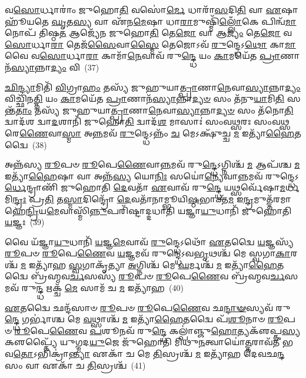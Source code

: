 {\anuvakamend[{𑌅\-\ul{𑌗𑍍𑌨𑍇} 𑌪𑍍𑌰𑍇𑌹𑍍𑌯𑌵᳴ 𑌸𑍍𑌮 𑌦𑍁\-\ul{𑌹𑍇} 𑌤𑌾𑌂 \ul{𑌪𑍍𑌰}\-𑌜𑌾𑌪᳴𑌤𑍇𑌃 \ul{𑌸𑌾}\-𑌕𑍍𑌷𑌾𑌨𑍍𑌮᳴𑌨𑍁𑌷𑍍𑌯\-\ul{𑌵𑌿}\-𑌶𑌮𑍇𑌕᳴𑌵𑌿𑍞𑌶𑌤𑌿𑌶𑍍𑌚}]}%

𑌵\-\ul{𑌸𑍋}\-𑌰𑍍𑌧𑌾𑌰𑌾𑌂॑ 𑌜𑍁𑌹𑍋\-\ul{𑌤𑌿} 𑌵𑌸𑍋॑\-\ul{𑌰𑍍𑌮𑍇} 𑌧𑌾𑌰𑌾᳴\-\ul{𑌸}\-𑌦𑌿\-\ul{𑌤𑌿} 𑌵𑌾 \ul{𑌏}\-𑌷𑌾 𑌹𑍂᳴𑌯𑌤𑍇 \ul{𑌘𑍃}\-𑌤\-\ul{𑌸𑍍𑌯} 𑌵𑌾 𑌏᳴𑌨\-\ul{𑌮𑍇}\-𑌷𑌾 𑌧𑌾\-\ul{𑌰𑌾}\-𑌮𑍁𑌷𑍍𑌮𑌿᳴\-\ul{𑌲𑍍𑌲𑍋𑌁}\-𑌕𑍇 𑌪𑌿𑌨𑍍𑌵᳴\-\ul{𑌮𑌾}\-𑌨𑍋𑌪᳴ 𑌤𑌿𑌷𑍍𑌠\-\ul{𑌤} 𑌆𑌜𑍍𑌯𑍇᳴𑌨 𑌜𑍁𑌹𑍋\-\ul{𑌤𑌿} 𑌤𑍇\-\ul{𑌜𑍋} 𑌵𑌾 𑌆\-\ul{𑌜𑍍𑌯𑌂} 𑌤𑍇\-\ul{𑌜𑍋} 𑌵\-\ul{𑌸𑍋}\-𑌰𑍍𑌧𑌾\-\ul{𑌰𑌾} 𑌤𑍇𑌜᳴\-\ul{𑌸𑍈}\-𑌵𑌾\-\ul{𑌸𑍍𑌮𑍈} 𑌤𑍇𑌜𑍋\-𑌽𑌵᳴ \ul{𑌰𑍁}\-𑌨𑍍𑌦𑍍𑌧𑍇\-𑌽\-\ul{𑌥𑍋} 𑌕𑌾\-\ul{𑌮𑌾} 𑌵𑍈 𑌵\-\ul{𑌸𑍋}\-𑌰𑍍𑌧𑌾\-\ul{𑌰𑌾} 𑌕𑌾𑌮𑌾᳴\-\ul{𑌨𑍇}\-𑌵𑌾𑌵᳴ 𑌰𑍁\-\ul{𑌨𑍍𑌦𑍍𑌧𑍇} 𑌯𑌂 \ul{𑌕𑌾}\-𑌮𑌯𑍇᳴𑌤 \ul{𑌪𑍍𑌰𑌾}\-𑌣𑌾𑌨᳴\-\ul{𑌸𑍍𑌯𑌾}\-𑌨𑍍𑌨𑌾\-\ul{𑌦𑍍𑌯𑌂} 𑌵𑌿~(37)

\-\ul{𑌛𑌿}\-\-\ul{𑌨𑍍𑌦𑍍𑌯𑌾}\-𑌮𑌿𑌤𑌿᳴ \ul{𑌵𑌿}\-𑌗𑍍𑌰𑌾\-\ul{𑌹𑌂} 𑌤𑌸𑍍𑌯᳴ 𑌜𑍁𑌹𑍁𑌯𑌾\-\ul{𑌤𑍍𑌪𑍍𑌰𑌾}\-𑌣𑌾\-\ul{𑌨𑍇}\-𑌵𑌾\-\ul{𑌸𑍍𑌯𑌾}\-𑌨𑍍𑌨𑌾\-\ul{𑌦𑍍𑌯𑌂} 𑌵𑌿𑌚𑍍𑌛𑌿᳴𑌨\-\ul{𑌤𑍍𑌤𑌿} 𑌯𑌂 \ul{𑌕𑌾}\-𑌮𑌯𑍇᳴𑌤 \ul{𑌪𑍍𑌰𑌾}\-𑌣𑌾𑌨᳴\-\ul{𑌸𑍍𑌯𑌾}\-𑌨𑍍𑌨𑌾\-\ul{𑌦𑍍𑌯}\-\-\ul{𑍞} 𑌸𑌂 𑌤᳴𑌨𑍁\-\ul{𑌯𑌾}\-𑌮𑌿\-\ul{𑌤𑌿} 𑌸𑌨𑍍𑌤᳴\-\ul{𑌤𑌾𑌂} 𑌤𑌸𑍍𑌯᳴ 𑌜𑍁𑌹𑍁𑌯𑌾\-\ul{𑌤𑍍𑌪𑍍𑌰𑌾}\-𑌣𑌾\-\ul{𑌨𑍇}\-𑌵𑌾\-\ul{𑌸𑍍𑌯𑌾}\-𑌨𑍍𑌨𑌾\-\ul{𑌦𑍍𑌯}\-\-\ul{𑍞} 𑌸𑌂 𑌤᳴𑌨𑍋\-\ul{𑌤𑌿} 𑌦𑍍𑌵𑌾𑌦᳴𑌶 𑌦𑍍𑌵𑌾\-\ul{𑌦}\-𑌶𑌾𑌨𑌿᳴ 𑌜𑍁𑌹𑍋\-\ul{𑌤𑌿} 𑌦𑍍𑌵𑌾𑌦᳴\-\ul{𑌶} 𑌮𑌾𑌸𑌾𑌃॑ 𑌸𑌂𑌵\-\ul{𑌥𑍍𑌸}\-𑌰𑌃 𑌸𑌂𑌵\-\ul{𑌥𑍍𑌸}\-𑌰𑍇\-\ul{𑌣𑍈}\-𑌵𑌾\-\ul{𑌸𑍍𑌮𑌾} 𑌅\-\ul{𑌨𑍍𑌨}\-𑌮𑌵᳴ \ul{𑌰𑍁}\-𑌨𑍍𑌦𑍍𑌧𑍇\-𑌽𑌨𑍍𑌨𑌂᳴ \ul{𑌚} 𑌮𑍇\-𑌽𑌕𑍍𑌷𑍁᳴𑌚𑍍𑌚 \ul{𑌮} 𑌇𑌤𑍍𑌯𑌾᳴\-\ul{𑌹𑍈}\-𑌤𑌦𑍍𑌵𑍈~(38)

𑌅𑌨𑍍𑌨᳴𑌸𑍍𑌯 \ul{𑌰𑍂}\-𑌪𑍞 \ul{𑌰𑍂}\-𑌪𑍇\-\ul{𑌣𑍈}\-𑌵𑌾\-\ul{𑌨𑍍𑌨}\-𑌮𑌵᳴ 𑌰𑍁\-\ul{𑌨𑍍𑌦𑍍𑌧𑍇}\-\-𑌽𑌗𑍍𑌨𑌿𑌶𑍍𑌚᳴ \ul{𑌮} 𑌆𑌪᳴𑌶𑍍𑌚 \ul{𑌮} 𑌇𑌤𑍍𑌯𑌾᳴\-\ul{𑌹𑍈}\-𑌷𑌾 𑌵𑌾 𑌅𑌨𑍍𑌨᳴\-\ul{𑌸𑍍𑌯} 𑌯𑍋\-\ul{𑌨𑌿𑌃} 𑌸𑌯𑍋॑\-\ul{𑌨𑍍𑌯𑍇}\-𑌵𑌾\-\ul{𑌨𑍍𑌨}\-𑌮𑌵᳴ 𑌰𑍁𑌨𑍍𑌦𑍍𑌧𑍇\-𑌽\-\ul{𑌰𑍍𑌧𑍇}\-𑌨𑍍𑌦𑍍𑌰𑌾𑌣𑌿᳴ 𑌜𑍁𑌹𑍋𑌤𑌿 \ul{𑌦𑍇}\-𑌵𑌤𑌾᳴ \ul{𑌏}\-𑌵𑌾𑌵᳴ 𑌰𑍁\-\ul{𑌨𑍍𑌦𑍍𑌧𑍇} 𑌯𑌥𑍍𑌸𑌰𑍍𑌵𑍇᳴𑌷𑌾\-\ul{𑌮}\-𑌰𑍍𑌧𑌮𑌿\-\ul{𑌨𑍍𑌦𑍍𑌰𑌃} 𑌪𑍍𑌰\-\ul{𑌤𑌿} 𑌤\-\ul{𑌸𑍍𑌮𑌾}\-𑌦𑌿𑌨𑍍𑌦𑍍𑌰𑍋᳴ \ul{𑌦𑍇}\-𑌵𑌤𑌾᳴𑌨𑌾𑌮𑍍𑌭𑍂𑌯𑌿\-\ul{𑌷𑍍𑌠}\-𑌭𑌾𑌕𑍍𑌤᳴\-\ul{𑌮} 𑌇\-\ul{𑌨𑍍𑌦𑍍𑌰}\-𑌮𑍁𑌤𑍍𑌤᳴𑌰𑌮𑌾𑌹𑍇\-\ul{𑌨𑍍𑌦𑍍𑌰𑌿}\-𑌯\-\ul{𑌮𑍇}\-𑌵𑌾𑌸𑍍𑌮𑌿᳴\-\ul{𑌨𑍍𑌨𑍁}\-𑌪𑌰𑌿᳴𑌷𑍍𑌟𑌾𑌦𑍍𑌦𑌧𑌾𑌤𑌿 𑌯𑌜𑍍𑌞𑌾\-\ul{𑌯𑍁}\-𑌧𑌾𑌨𑌿᳴ 𑌜𑍁𑌹𑍋𑌤𑌿 \ul{𑌯}\-𑌜𑍍𑌞𑌃~(39)

𑌵𑍈 𑌯᳴𑌜𑍍𑌞𑌾\-\ul{𑌯𑍁}\-𑌧𑌾𑌨𑌿᳴ \ul{𑌯}\-𑌜𑍍𑌞\-\ul{𑌮𑍇}\-𑌵𑌾𑌵᳴ \ul{𑌰𑍁}\-𑌨𑍍𑌦𑍍𑌧𑍇\-𑌽𑌥𑍋᳴ \ul{𑌏}\-𑌤𑌦𑍍𑌵𑍈 \ul{𑌯}\-𑌜𑍍𑌞𑌸𑍍𑌯᳴ \ul{𑌰𑍂}\-𑌪𑍞 \ul{𑌰𑍂}\-𑌪𑍇\-\ul{𑌣𑍈}\-𑌵 \ul{𑌯}\-𑌜𑍍𑌞𑌮𑌵᳴ 𑌰𑍁𑌨𑍍𑌦𑍍𑌧𑍇\-𑌽𑌵\-\ul{𑌭𑍃}\-𑌥𑌶𑍍𑌚᳴ 𑌮𑍇 𑌸𑍍𑌵𑌗𑌾\-\ul{𑌕𑌾}\-𑌰𑌶𑍍𑌚᳴ \ul{𑌮} 𑌇𑌤𑍍𑌯𑌾᳴𑌹 \ul{𑌸𑍍𑌵}\-𑌗𑌾𑌕𑍃᳴𑌤𑍍𑌯𑌾 \ul{𑌅}\-𑌗𑍍𑌨𑌿𑌶𑍍𑌚᳴ 𑌮𑍇 \ul{𑌘}\-𑌰𑍍𑌮𑌶𑍍𑌚᳴ \ul{𑌮} 𑌇𑌤𑍍𑌯𑌾᳴\-\ul{𑌹𑍈}\-𑌤𑌦𑍍𑌵𑍈 𑌬𑍍𑌰᳴𑌹𑍍𑌮𑌵\-\ul{𑌰𑍍𑌚}\-𑌸𑌸𑍍𑌯᳴ \ul{𑌰𑍂}\-𑌪𑍞 \ul{𑌰𑍂}\-𑌪𑍇\-\ul{𑌣𑍈}\-𑌵 𑌬𑍍𑌰᳴𑌹𑍍𑌮𑌵\-\ul{𑌰𑍍𑌚}\-𑌸𑌮𑌵᳴ 𑌰𑍁\-\ul{𑌨𑍍𑌦𑍍𑌧} 𑌋𑌕𑍍𑌚᳴ \ul{𑌮𑍇} 𑌸𑌾𑌮᳴ 𑌚 \ul{𑌮} 𑌇𑌤𑍍𑌯𑌾᳴𑌹~(40)

\-\ul{𑌏}\-𑌤𑌦𑍍𑌵𑍈 𑌛𑌨𑍍𑌦᳴𑌸𑌾𑍞 \ul{𑌰𑍂}\-𑌪𑍞 \ul{𑌰𑍂}\-𑌪𑍇\-\ul{𑌣𑍈}\-𑌵 𑌛\-\ul{𑌨𑍍𑌦𑌾}\-\-\ul{𑍟}\-𑌸𑍍𑌯𑌵᳴ 𑌰𑍁\-\ul{𑌨𑍍𑌦𑍍𑌧𑍇} 𑌗𑌰𑍍𑌭𑌾॑𑌶𑍍𑌚 𑌮𑍇 \ul{𑌵}\-𑌥𑍍𑌸𑌾𑌶𑍍𑌚᳴ \ul{𑌮} 𑌇𑌤𑍍𑌯𑌾᳴\-\ul{𑌹𑍈}\-𑌤𑌦𑍍𑌵𑍈 𑌪᳴\-\ul{𑌶𑍂}\-𑌨𑌾𑍞 \ul{𑌰𑍂}\-𑌪𑍞 \ul{𑌰𑍂}\-𑌪𑍇\-\ul{𑌣𑍈}\-𑌵 \ul{𑌪}\-𑌶𑍂𑌨𑌵᳴ 𑌰𑍁\-\ul{𑌨𑍍𑌦𑍍𑌧𑍇} 𑌕𑌲𑍍𑌪𑌾॑𑌞𑍍𑌜𑍁\-\ul{𑌹𑍋}\-𑌤𑍍𑌯𑌕𑍢᳴𑌪𑍍𑌤\-\ul{𑌸𑍍𑌯} 𑌕𑍢𑌪𑍍𑌤𑍍𑌯𑍈᳴ 𑌯𑍁𑌗𑍍𑌮𑌦\-\ul{𑌯𑍁}\-𑌜𑍇 𑌜𑍁᳴𑌹𑍋𑌤𑌿 𑌮𑌿𑌥𑍁\-\ul{𑌨}\-𑌤𑍍𑌵𑌾𑌯𑍋॑\-\ul{𑌤𑍍𑌤}\-𑌰𑌾𑌵᳴𑌤𑍀 𑌭𑌵\-\ul{𑌤𑍋}\-\-𑌽𑌭𑌿𑌕𑍍𑌰𑌾॑\-\ul{𑌨𑍍𑌤𑍍𑌯𑌾} 𑌏𑌕𑌾᳴ 𑌚 𑌮𑍇 \ul{𑌤𑌿}\-𑌸𑍍𑌰𑌶𑍍𑌚᳴ \ul{𑌮} 𑌇𑌤𑍍𑌯𑌾᳴𑌹 𑌦𑍇𑌵𑌛\-\ul{𑌨𑍍𑌦}\-𑌸𑌂 𑌵𑌾 𑌏𑌕𑌾᳴ 𑌚 \ul{𑌤𑌿}\-𑌸𑍍𑌰𑌶𑍍𑌚᳴~(41)

